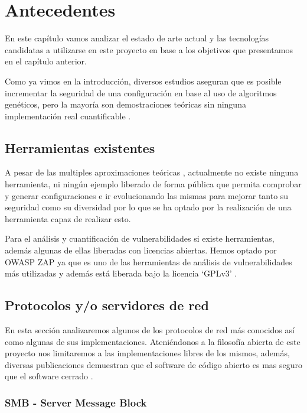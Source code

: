 \chapter{Antecedentes}

En este capítulo vamos analizar el estado de arte actual y las tecnologías candidatas a utilizarse en este proyecto en base a los objetivos que presentamos en el capítulo anterior.

\bigskip
Como ya vimos en la introducción, diversos estudios aseguran que es posible incrementar la seguridad de una configuración en base al uso de algoritmos genéticos, pero la mayoría son demostraciones teóricas sin ninguna implementación real cuantificable  \cite{john_evolutionary_2014} \cite{romero_sistema_2017} \cite{buji_genetic_2017}. 

\section{Herramientas existentes}
A pesar de las multiples aproximaciones teóricas \cite{schlenker_deceiving_2018} \cite{champagne_genetic_2018}, actualmente no existe ninguna herramienta, ni ningún ejemplo liberado de forma pública que permita comprobar y generar configuraciones e ir evolucionando las mismas para mejorar tanto su seguridad como su diversidad por lo que se ha optado por la realización de una herramienta capaz de realizar esto.

\bigskip
Para el análisis y cuantificación de vulnerabilidades si existe herramientas, además algunas de ellas liberadas con licencias abiertas. Hemos optado por OWASP ZAP ya que es uno de las herramientas de análisis de vulnerabilidades más utilizadas y además está liberada bajo la licencia `GPLv3' \cite{free_software_foundation_gnu_2007}.

\section {Protocolos y/o servidores de red}

En esta sección analizaremos algunos de los protocolos de red más conocidos así como algunas de sus implementaciones. Ateniéndonos a la filosofía abierta de este proyecto nos limitaremos a las implementaciones libres de los mismos, además, diversas publicaciones demuestran que el software de código abierto es mas seguro que el software cerrado \cite{clark_is_2009}.

\subsection {SMB - Server Message Block}

